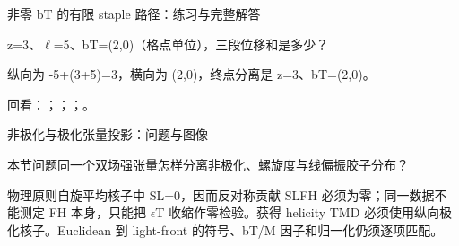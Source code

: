 \begin{frame}[t]{非零 bT 的有限 staple 路径：练习与完整解答}
\footnotesize
\begin{block}{}z=3、\ensuremath{\ell}=5、bT=(2,0)（格点单位），三段位移和是多少？\end{block}
\begin{exampleblock}{}纵向为 -5+(3+5)=3，横向为 (2,0)，终点分离是 z=3、bT=(2,0)。\end{exampleblock}
\vfill
\scriptsize 回看：；；；。
\end{frame}

\begin{frame}[t]{非极化与极化张量投影：问题与图像}
\footnotesize
\begin{block}{本节问题}同一个双场强张量怎样分离非极化、螺旋度与线偏振胶子分布？\end{block}
\begin{block}{物理原则}\quad 自旋平均核子中 SL=0，因而反对称贡献 SLFH 必须为零；同一数据不能测定 FH 本身，只能把 \ensuremath{\epsilon}T 收缩作零检验。获得 helicity TMD 必须使用纵向极化核子。Euclidean 到 light-front 的符号、bT/\allowbreak{}M 因子和归一化仍须逐项匹配。\end{block}
\end{frame}

